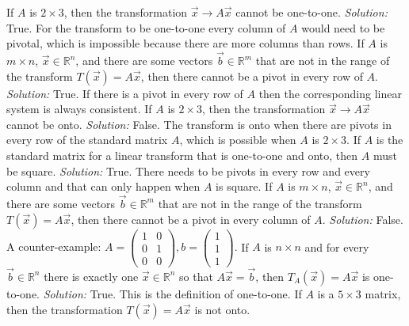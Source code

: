 \ifnum {}         
    If $A$ is $2 \times 3$, then the transformation $\vec x \to A\vec x$ cannot be one-to-one.
    \ifnum {} {\color{DarkBlue} \textit{Solution:  } True. For the transform to be one-to-one every column of $A$ would need to be pivotal, which is impossible because there are more columns than rows.  } \fi
\fi
\ifnum {}      
    If $A$ is $m\times n$, $\vec x \in \mathbb R^n$, and there are some vectors $\vec b \in \mathbb R^m$ that are not in the range of the transform $T(\vec x) = A\vec x$, then there cannot be a pivot in every row of $A$. 
    \ifnum {} {\color{DarkBlue} \textit{Solution:  } True. If there is a pivot in every row of $A$ then the corresponding linear system is always consistent.} \fi
\fi    
\ifnum {}  
    If $A$ is $2 \times 3$, then the transformation $\vec x \to A\vec x$ cannot be onto. 
    \ifnum {} {\color{DarkBlue} \textit{Solution:  }  False. The transform is onto when there are pivots in every row of the standard matrix $A$, which is possible when $A$ is $2\times 3$. } \fi
\fi    
\ifnum {}    
    If $A$ is the standard matrix for a linear transform that is one-to-one and onto, then $A$ must be square. 
    \ifnum {} {\color{DarkBlue} \textit{Solution:  } True. There needs to be pivots in every row and every column and that can only happen when $A$ is square.} \fi
\fi   
\ifnum {}    
    If $A$ is $m\times n$, $\vec x \in \mathbb R^n$, and there are some vectors $\vec b \in \mathbb R^m$ that are not in the range of the transform $T(\vec x) = A\vec x$, then there cannot be a pivot in every column of $A$. 
    \ifnum {} {\color{DarkBlue} \textit{Solution:  } False. A counter-example: \setlength{\extrarowheight}{0.0cm}$A=\begin{pmatrix} 1&0\\0&1\\0&0\end{pmatrix}, b = \begin{pmatrix} 1\\1\\1\end{pmatrix}$. } \fi
\fi    
\ifnum {}      
    If $A$ is $n\times n$ and for every $\vec b \in \mathbb R^n$ there is exactly one $\vec x \in \mathbb R^n$ so that $A \vec x = \vec b$, then $ T_A(\vec x) = A\vec x $ is one-to-one.
    \ifnum {} {\color{DarkBlue} \textit{Solution:  } True. This is the definition of one-to-one. } \fi
\fi        
\ifnum {} 
    If $A$ is a $5 \times 3$ matrix, then the transformation $T (\vec x)=A\vec x$ is not onto. 
